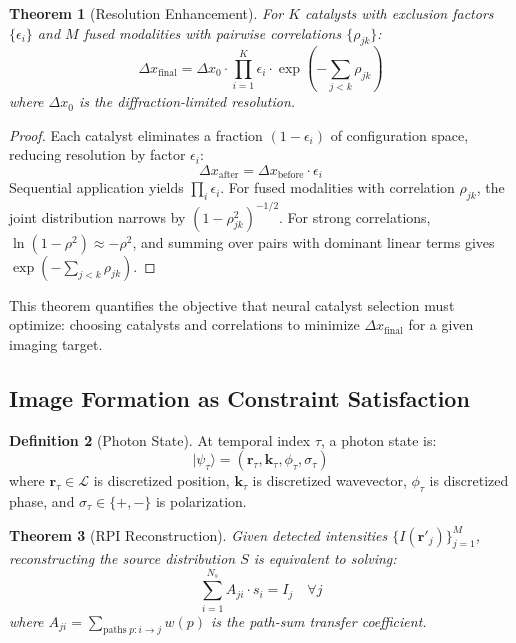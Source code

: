\documentclass[11pt,twocolumn,a4paper]{article}
\newtheorem{theorem}{Theorem}[section]
\theoremstyle{definition}
\newtheorem{definition}[theorem]{Definition}
\theoremstyle{remark}
\begin{document}
\begin{theorem}[Resolution Enhancement]
\label{thm:resolution}
For $K$ catalysts with exclusion factors $\{\epsilon_i\}$ and $M$ fused modalities with pairwise correlations $\{\rho_{jk}\}$:
\begin{equation}
\Delta x_{\mathrm{final}} = \Delta x_0 \cdot \prod_{i=1}^{K} \epsilon_i \cdot \exp\left(-\sum_{j<k} \rho_{jk}\right)
\end{equation}
where $\Delta x_0$ is the diffraction-limited resolution.
\end{theorem}

\begin{proof}
Each catalyst eliminates a fraction $(1 - \epsilon_i)$ of configuration space, reducing resolution by factor $\epsilon_i$:
\begin{equation}
\Delta x_{\mathrm{after}} = \Delta x_{\mathrm{before}} \cdot \epsilon_i
\end{equation}
Sequential application yields $\prod_i \epsilon_i$. For fused modalities with correlation $\rho_{jk}$, the joint distribution narrows by $(1 - \rho_{jk}^2)^{-1/2}$. For strong correlations, $\ln(1 - \rho^2) \approx -\rho^2$, and summing over pairs with dominant linear terms gives $\exp(-\sum_{j<k} \rho_{jk})$.
\end{proof}

This theorem quantifies the objective that neural catalyst selection must optimize: choosing catalysts and correlations to minimize $\Delta x_{\mathrm{final}}$ for a given imaging target.

\subsection{Image Formation as Constraint Satisfaction}

\begin{definition}[Photon State]
At temporal index $\tau$, a photon state is:
\begin{equation}
|\psi_\tau\rangle = (\mathbf{r}_\tau, \mathbf{k}_\tau, \phi_\tau, \sigma_\tau)
\end{equation}
where $\mathbf{r}_\tau \in \mathcal{L}$ is discretized position, $\mathbf{k}_\tau$ is discretized wavevector, $\phi_\tau$ is discretized phase, and $\sigma_\tau \in \{+, -\}$ is polarization.
\end{definition}

\begin{theorem}[RPI Reconstruction]
\label{thm:rpi}
Given detected intensities $\{I(\mathbf{r}'_j)\}_{j=1}^M$, reconstructing the source distribution $S$ is equivalent to solving:
\begin{equation}
\sum_{i=1}^{N_s} A_{ji} \cdot s_i = I_j \quad \forall j
\end{equation}
where $A_{ji} = \sum_{\mathrm{paths}\; p: i \to j} w(p)$ is the path-sum transfer coefficient.
\end{theorem}
\end{document}
